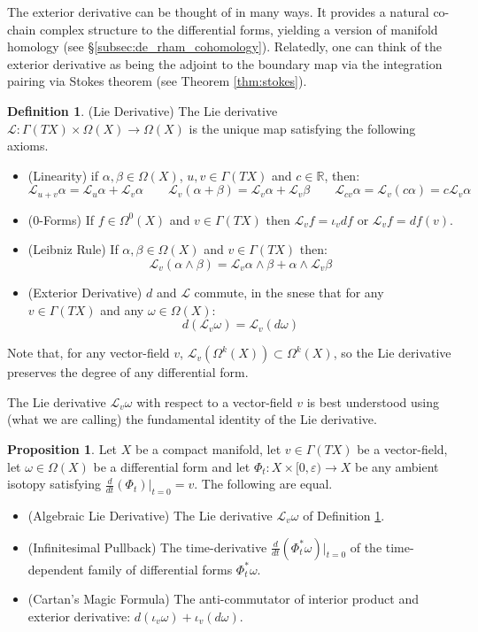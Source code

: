 \documentclass[12pt]{article}
\theoremstyle{definition}
\newtheorem{definition}[theorem]{Definition}
\newtheorem{proposition}[theorem]{Proposition}
\numberwithin{equation}{section}
\newcommand{\R}{{\mathbb R}}
\renewcommand{\epsilon}{\varepsilon}
\begin{document}
The exterior derivative can be thought of in many ways. It provides a natural co-chain complex structure to the differential forms, yielding a version of manifold homology (see \S \ref{subsec:de_rham_cohomology}). Relatedly, one can think of the exterior derivative as being the adjoint to the boundary map via the integration pairing via Stokes theorem (see Theorem \ref{thm:stokes}).

\begin{definition} \label{def:lie_derivative} (Lie Derivative) The Lie derivative $\mathcal{L}:\Gamma(TX) \times \Omega(X) \to \Omega(X)$ is the unique map satisfying the following axioms.
\begin{itemize}
	\item[(a)] (Linearity) if $\alpha,\beta \in \Omega(X)$, $u,v \in \Gamma(TX)$ and $c \in \R$, then:
	\[\mathcal{L}_{u + v}\alpha = \mathcal{L}_u\alpha +  \mathcal{L}_v\alpha \qquad \mathcal{L}_v(\alpha + \beta) = \mathcal{L}_v\alpha + \mathcal{L}_v\beta \qquad \mathcal{L}_{cv}\alpha = \mathcal{L}_v(c\alpha) = c\mathcal{L}_v\alpha\]
	\item[(b)] (0-Forms) If $f \in \Omega^0(X)$ and $v \in \Gamma(TX)$ then $\mathcal{L}_vf = \iota_v df$ or $\mathcal{L}_vf = df(v)$.
	\item[(c)] (Leibniz Rule) If $\alpha,\beta \in \Omega(X)$ and $v \in \Gamma(TX)$ then:
	\[\mathcal{L}_v(\alpha \wedge \beta) = \mathcal{L}_v\alpha \wedge \beta + \alpha \wedge \mathcal{L}_v\beta\]
	\item[(d)] (Exterior Derivative) $d$ and $\mathcal{L}$ commute, in the snese that for any $v \in \Gamma(TX)$ and any $\omega \in \Omega(X)$:
	\[
	d(\mathcal{L}_v\omega) = \mathcal{L}_v(d\omega)
	\] 
\end{itemize}
Note that, for any vector-field $v$, $\mathcal{L}_v(\Omega^k(X)) \subset \Omega^k(X)$, so the Lie derivative preserves the degree of any differential form.
\end{definition}

The Lie derivative $\mathcal{L}_v\omega$ with respect to a vector-field $v$ is best understood using (what we are calling) the fundamental identity of the Lie derivative. 

\begin{proposition} Let $X$ be a compact manifold, let $v \in \Gamma(TX)$ be a vector-field, let $\omega \in \Omega(X)$ be a differential form and let $\Phi_t:X \times [0,\epsilon) \to X$ be any ambient isotopy satisfying $\frac{d}{dt}(\Phi_t)|_{t = 0} = v$. The following are equal.
\begin{itemize}
	\item[(a)] (Algebraic Lie Derivative) The Lie derivative $\mathcal{L}_v\omega$ of Definition \ref{def:lie_derivative}.
	\item[(b)] (Infinitesimal Pullback) The time-derivative $\frac{d}{dt}(\Phi^*_t\omega)|_{t = 0}$ of the time-dependent family of differential forms $\Phi^*_t\omega$.
	\item[(c)] (Cartan's Magic Formula) The anti-commutator of interior product and exterior derivative: $d(\iota_v\omega) + \iota_v(d\omega)$.
\end{itemize}
\end{proposition}
\end{document}
